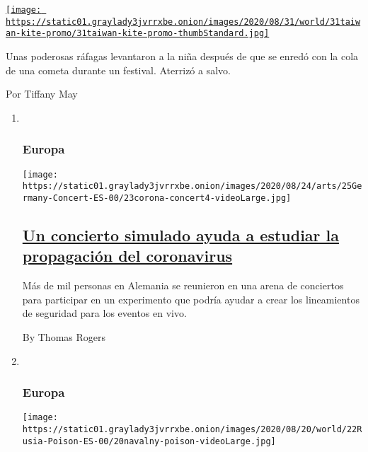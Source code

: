 \begin{enumerate}
\begin{enumerate}
    \href{/es/2020/08/31/espanol/mundo/nina-cometa-taiwan.html}{\texttt{[image: https://static01.graylady3jvrrxbe.onion/images/2020/08/31/world/31taiwan-kite-promo/31taiwan-kite-promo-thumbStandard.jpg]}}

    Unas poderosas ráfagas levantaron a la niña después de que se enredó
    con la cola de una cometa durante un festival. Aterrizó a salvo.

    Por Tiffany May
  \end{enumerate}
\end{enumerate}

\begin{enumerate}
\def\labelenumi{\arabic{enumi}.}
\item ~
  \hypertarget{europa-1}{%
  \subsubsection{Europa}\label{europa-1}}

  \texttt{[image: https://static01.graylady3jvrrxbe.onion/images/2020/08/24/arts/25Germany-Concert-ES-00/23corona-concert4-videoLarge.jpg]}

  \hypertarget{un-concierto-simulado-ayuda-a-estudiar-la-propagaciuxf3n-del-coronavirus}{%
  \subsection{\texorpdfstring{\href{/es/2020/08/25/espanol/mundo/concierto-alemania-experimento.html}{Un
  concierto simulado ayuda a estudiar la propagación del
  coronavirus}}{Un concierto simulado ayuda a estudiar la propagación del coronavirus}}\label{un-concierto-simulado-ayuda-a-estudiar-la-propagaciuxf3n-del-coronavirus}}

  Más de mil personas en Alemania se reunieron en una arena de
  conciertos para participar en un experimento que podría ayudar a crear
  los lineamientos de seguridad para los eventos en vivo.

  By Thomas Rogers
\item ~
  \hypertarget{europa-2}{%
  \subsubsection{Europa}\label{europa-2}}

  \texttt{[image: https://static01.graylady3jvrrxbe.onion/images/2020/08/20/world/22Rusia-Poison-ES-00/20navalny-poison-videoLarge.jpg]}

  \hypertarget{no-beba-el-tuxe9-el-veneno-es-un-arma-favorita-en-rusia}{%
}
\end{enumerate}
